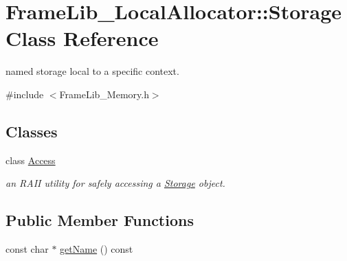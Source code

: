 \hypertarget{class_frame_lib___local_allocator_1_1_storage}{}\section{Frame\+Lib\+\_\+\+Local\+Allocator\+:\+:Storage Class Reference}
\label{class_frame_lib___local_allocator_1_1_storage}


named storage local to a specific context.  




{\ttfamily \#include $<$Frame\+Lib\+\_\+\+Memory.\+h$>$}

\subsection*{Classes}
\begin{DoxyCompactItemize}
\item 
class \hyperlink{class_frame_lib___local_allocator_1_1_storage_1_1_access}{Access}
\begin{DoxyCompactList}\small\item\em an R\+A\+II utility for safely accessing a \hyperlink{class_frame_lib___local_allocator_1_1_storage}{Storage} object. \end{DoxyCompactList}\end{DoxyCompactItemize}
\subsection*{Public Member Functions}
\begin{DoxyCompactItemize}
\item 
const char $\ast$ \hyperlink{class_frame_lib___local_allocator_1_1_storage_ac1a8a26c698837c22b87b76999041bf2}{get\+Name} () const
\end{DoxyCompactItemize}
